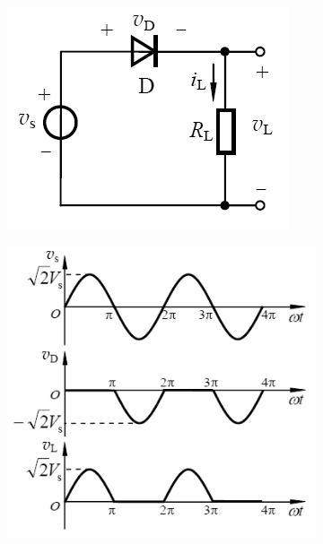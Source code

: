 \begin{figure}[H]
  \centering
  \begin{subfigure}{.5\textwidth}
    \centering
    \includegraphics[width=\linewidth]{figures/Half-Wave-Rect}
  \end{subfigure}
  \begin{subfigure}{.45\textwidth}
    \centering
    \includegraphics[width=\linewidth]{figures/Half-Wave-Rect-diag}
  \end{subfigure}
\end{figure}

